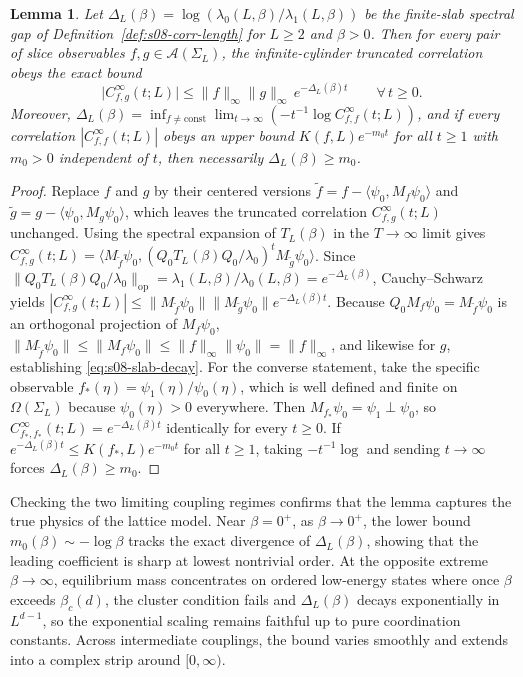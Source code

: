 \documentclass[11pt]{article}
\newtheorem{lemma}[theorem]{Lemma}
\theoremstyle{definition}
\begin{document}
\begin{lemma}
\label{lem:s08-slab-rate}
Let $\Delta_L(\beta) = \log(\lambda_0(L, \beta) / \lambda_1(L, \beta))$ be the
finite-slab spectral gap of Definition~\ref{def:s08-corr-length} for $L \ge 2$ and
$\beta > 0$. Then for every pair of slice observables $f, g \in
\mathcal{A}(\Sigma_L)$, the infinite-cylinder truncated correlation obeys the exact
bound
\begin{equation}
\label{eq:s08-slab-decay}
  \bigl|C_{f,g}^\infty(t; L)\bigr| \le \|f\|_\infty \|g\|_\infty \, e^{-\Delta_L(\beta) t} \qquad \forall \, t \ge 0.
\end{equation}
Moreover, $\Delta_L(\beta) = \inf_{f \neq \mathrm{const}} \lim_{t \to \infty}
(-t^{-1} \log C_{f,f}^\infty(t; L))$, and if every correlation $|C_{f,f}^\infty(t;
L)|$ obeys an upper bound $K(f, L) e^{-m_0 t}$ for all $t \ge 1$ with $m_0 > 0$
independent of $t$, then necessarily $\Delta_L(\beta) \ge m_0$.
\end{lemma}
\begin{proof}
Replace $f$ and $g$ by their centered versions $\tilde{f} = f - \langle \psi_0, M_f
\psi_0 \rangle$ and $\tilde{g} = g - \langle \psi_0, M_g \psi_0 \rangle$, which
leaves the truncated correlation $C_{f,g}^\infty(t; L)$ unchanged. Using the
spectral expansion of $T_L(\beta)$ in the $T \to \infty$ limit gives
$C_{f,g}^\infty(t; L) = \langle M_{\tilde{f}} \psi_0, (Q_0 T_L(\beta) Q_0 /
\lambda_0)^t M_{\tilde{g}} \psi_0 \rangle$. Since $\|Q_0 T_L(\beta) Q_0 /
\lambda_0\|_{\mathrm{op}} = \lambda_1(L, \beta) / \lambda_0(L, \beta) =
e^{-\Delta_L(\beta)}$, Cauchy--Schwarz yields $|C_{f,g}^\infty(t; L)| \le
\|M_{\tilde{f}} \psi_0\| \|M_{\tilde{g}} \psi_0\| e^{-\Delta_L(\beta) t}$. Because
$Q_0 M_f \psi_0 = M_{\tilde{f}} \psi_0$ is an orthogonal projection of $M_f \psi_0$,
$\|M_{\tilde{f}} \psi_0\| \le \|M_f \psi_0\| \le \|f\|_\infty \|\psi_0\| =
\|f\|_\infty$, and likewise for $g$, establishing \eqref{eq:s08-slab-decay}. For the
converse statement, take the specific observable $f_*(\eta) = \psi_1(\eta) /
\psi_0(\eta)$, which is well defined and finite on $\Omega(\Sigma_L)$ because
$\psi_0(\eta) > 0$ everywhere. Then $M_{f_*} \psi_0 = \psi_1 \perp \psi_0$, so
$C_{f_*, f_*}^\infty(t; L) = e^{-\Delta_L(\beta) t}$ identically for every $t \ge
0$. If $e^{-\Delta_L(\beta) t} \le K(f_*, L) e^{-m_0 t}$ for all $t \ge 1$, taking
$-t^{-1} \log$ and sending $t \to \infty$ forces $\Delta_L(\beta) \ge m_0$.
\end{proof}

Checking the two limiting coupling regimes confirms that the lemma captures the true
physics of the lattice model. Near $\beta = 0^+$, as $\beta \to 0^+$, the lower
bound $m_0(\beta) \sim -\log \beta$ tracks the exact divergence of
$\Delta_L(\beta)$, showing that the leading coefficient is sharp at lowest
nontrivial order. At the opposite extreme $\beta \to \infty$, equilibrium mass
concentrates on ordered low-energy states where once $\beta$ exceeds $\beta_c(d)$,
the cluster condition fails and $\Delta_L(\beta)$ decays exponentially in $L^{d-1}$,
so the exponential scaling remains faithful up to pure coordination constants.
Across intermediate couplings, the bound varies smoothly and extends into a complex
strip around $[0, \infty)$.
\end{document}

